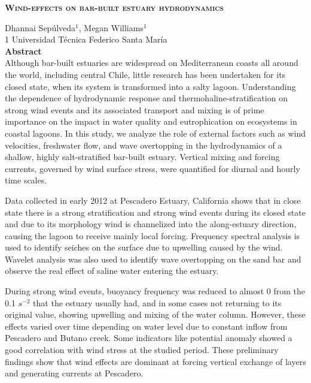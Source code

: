 \documentclass[11pt,letterpaper]{article}
\begin{document}
\clearpage


\newpage
\begin{center}
    \textsc{\textbf{\Large Wind-effects on bar-built estuary hydrodynamics}}
\end{center}
Dhannai Sepúlveda$^1$, Megan Williams$^1$\\

1 Universidad Técnica Federico Santa María\\

\textbf{Abstract}\\
Although bar-built estuaries are widespread on Mediterranean coasts all around the world, including central Chile, little research has been undertaken for its closed state, when its system is transformed into a salty lagoon. Understanding the dependence of hydrodynamic response and thermohaline-stratification on strong wind events and its associated transport and mixing is of prime importance on the impact in water quality and eutrophication on ecosystems in coastal lagoons. In this study, we analyze the role of external factors such as wind velocities, freshwater flow, and wave overtopping in the hydrodynamics of a shallow, highly salt-stratified bar-built estuary. Vertical mixing and forcing currents, governed by wind surface stress, were quantified for diurnal and hourly time scales.

Data collected in early 2012 at Pescadero Estuary, California shows that in close state there is a strong stratification and strong wind events during its closed state and due to its morphology wind is channelized into the along-estuary direction, causing the lagoon to receive mainly local forcing. Frequency spectral analysis is used to identify seiches on the surface due to upwelling caused by the wind. Wavelet analysis was also used to identify wave overtopping on the sand bar and observe the real effect of saline water entering the estuary. 

During strong wind events, buoyancy frequency was reduced to almost 0 from the 0.1 $s^{-2}$ that the estuary usually had, and in some cases not returning to its original value, showing upwelling and mixing of the water column. However, these effects varied over time depending on water level due to constant inflow from Pescadero and Butano creek. Some indicators like potential anomaly showed a good correlation with wind stress at the studied period. These preliminary findings show that wind effects are dominant at forcing vertical exchange of layers and generating currents at Pescadero.\\
\end{document}
